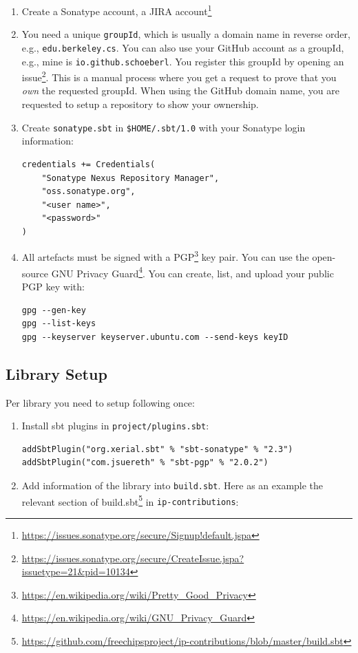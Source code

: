 \documentclass[%
    10pt,
    headinclude, footexclude,
    openright, %
    notitlepage,
    cleardoubleempty,
    headsepline,
    pointlessnumbers,
    bibtotoc, idxtotoc,
    ]{scrbook}
\newcommand{\code}[1]{{\small{\texttt{#1}}}}
\newcommand{\myref}[2]{\href{#1}{#2}}
\renewcommand{\myref}[2]{{#2}{\footnote{\url{#1}}}}
\begin{document}
\begin{enumerate}
\item Create a Sonatype account, a \myref{https://issues.sonatype.org/secure/Signup!default.jspa}{JIRA account}
\item You need a unique \code{groupId}, which is usually a domain name in reverse order, e.g., \code{edu.berkeley.cs}.
You can also use your GitHub account as a groupId, e.g., mine is \code{io.github.schoeberl}. You register this groupId
by opening an \myref{https://issues.sonatype.org/secure/CreateIssue.jspa?issuetype=21&pid=10134}{issue}.
This is a manual process where you get a request to prove that you \emph{own} the requested groupId.
When using the GitHub domain name, you are requested to setup a repository to show your ownership.
\item Create \code{sonatype.sbt} in \code{\$HOME/.sbt/1.0} with your Sonatype login information:
\begin{verbatim}
credentials += Credentials(
    "Sonatype Nexus Repository Manager",
    "oss.sonatype.org",
    "<user name>",
    "<password>"
)
\end{verbatim}
\item All artefacts must be signed with a \myref{https://en.wikipedia.org/wiki/Pretty_Good_Privacy}{PGP} key pair.
You can use the open-source \myref{https://en.wikipedia.org/wiki/GNU_Privacy_Guard}{GNU Privacy Guard}.
You can create, list, and upload your public PGP key with:
\begin{verbatim}
gpg --gen-key
gpg --list-keys
gpg --keyserver keyserver.ubuntu.com --send-keys keyID
\end{verbatim}
\end{enumerate}

\subsection{Library Setup}

Per library you need to setup following once:

\begin{enumerate}
\item Install sbt plugins in \code{project/plugins.sbt}:
\begin{verbatim}
addSbtPlugin("org.xerial.sbt" % "sbt-sonatype" % "2.3")
addSbtPlugin("com.jsuereth" % "sbt-pgp" % "2.0.2")
\end{verbatim}
\item Add information of the library into \code{build.sbt}. Here as an example
the relevant section of \myref{https://github.com/freechipsproject/ip-contributions/blob/master/build.sbt}{build.sbt}
in \code{ip-contributions}:
\end{enumerate}
\end{document}
